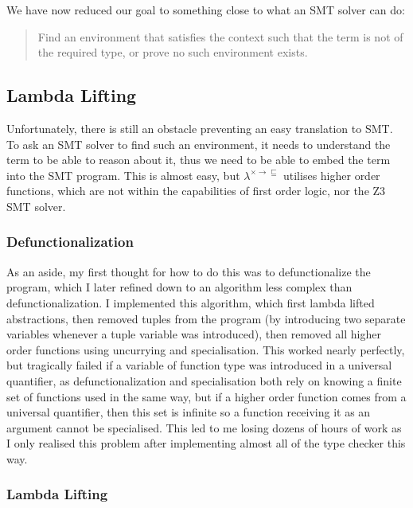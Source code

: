 We have now reduced our goal to something close to what an SMT solver can do:

\begin{quote}
    Find an environment that satisfies the context such that the term is not of the required type,
    or prove no such environment exists.
\end{quote}

\subsection{Lambda Lifting}

Unfortunately, there is still an obstacle preventing an easy translation to SMT.
To ask an SMT solver to find such an environment, it needs to understand the term to be able to reason
about it, thus we need to be able to embed the term into the SMT program.
This is almost easy, but $\lambda^{\times \rightarrow \sqsubseteq}$ utilises higher order functions,
which are not within the capabilities of first order logic, nor the Z3 SMT solver.

\subsubsection{Defunctionalization}

As an aside, my first thought for how to do this was to defunctionalize the program, which I later
refined down to an algorithm less complex than defunctionalization.
I implemented this algorithm, which first lambda lifted abstractions, then removed tuples from the
program (by introducing two separate variables whenever a tuple variable was introduced), then removed
all higher order functions using uncurrying and specialisation.
This worked nearly perfectly, but tragically failed if a variable of function type was introduced
in a universal quantifier, as defunctionalization and specialisation both rely on knowing a finite
set of functions used in the same way, but if a higher order function comes from a universal
quantifier, then this set is infinite so a function receiving it as an argument cannot be specialised.
This led to me losing dozens of hours of work as I only realised this problem after implementing
almost all of the type checker this way.

\subsubsection{Lambda Lifting}

